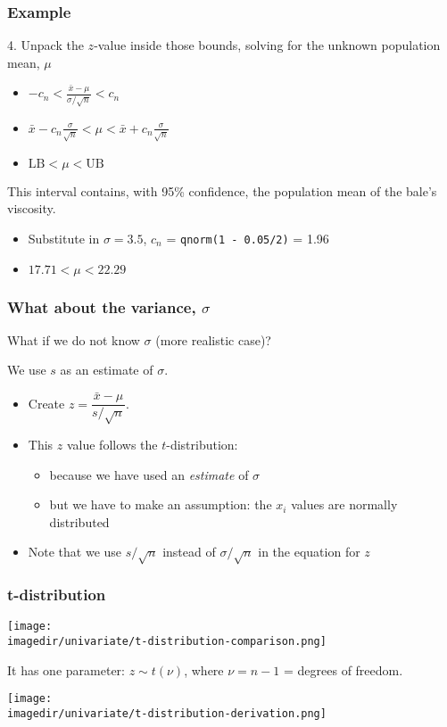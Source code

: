 \begin{frame}\frametitle{Example}

	4. Unpack the $z$-value inside those bounds, solving for the unknown population mean, $\mu$
	\begin{itemize}
		\item$\displaystyle - c_n < \frac{\bar{x} - \mu}{\sigma / \sqrt{n}} < c_n$ \pause
		\item$\displaystyle \bar{x} - c_n\frac{\sigma}{\sqrt{n}} < \mu < \bar{x} + c_n\frac{\sigma}{\sqrt{n}}$ \pause
		\item$\displaystyle \text{LB} < \mu < \text{UB}$
	\end{itemize}

	This interval contains, with 95\% confidence, the population mean of the bale's viscosity.
	\begin{itemize}
		\item Substitute in $\sigma = 3.5$, $c_n$ = \texttt{qnorm(1 - 0.05/2)} = 1.96
		\item$17.71 < \mu < 22.29$
	\end{itemize}
\end{frame}

\begin{frame}\frametitle{What about the variance, $\sigma$}

	What if we do not know $\sigma$ (more realistic case)?\pause

	We use $s$ as an estimate of $\sigma$.
	\begin{itemize}
		\item Create $z = \dfrac{\bar{x} - \mu}{s/\sqrt{n}}$.
		\item This $z$ value follows the $t$-distribution:
		\begin{itemize}
			\item because we have used an \emph{estimate} of $\sigma$
			\item but we have to make an assumption: the $x_i$ values are normally distributed
		\end{itemize}
		\item Note that we use $s/\sqrt{n}$ instead of $\sigma/\sqrt{n}$ in the equation for $z$
	\end{itemize}
\end{frame}

\begin{frame}\frametitle{t-distribution}
	\begin{center}
		\texttt{[image: \\imagedir/univariate/t-distribution-comparison.png]}
	\end{center}
	It has one parameter: $z \sim t\left(\nu\right)$, where $\nu = n-1$ = degrees of freedom.
	\begin{center}
		\texttt{[image: \\imagedir/univariate/t-distribution-derivation.png]}
	\end{center}
\end{frame}

